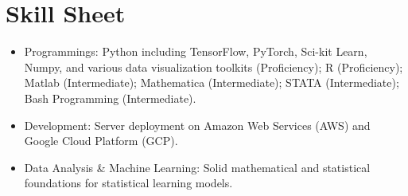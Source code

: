 \documentclass[a4paper,10pt]{article}
\begin{document}


\section{Skill Sheet}
	\begin{itemize}
		\item Programmings: Python including TensorFlow, PyTorch, Sci-kit Learn, Numpy, and various data visualization toolkits (Proficiency); R (Proficiency); Matlab (Intermediate); Mathematica (Intermediate); STATA (Intermediate); Bash Programming (Intermediate).
		\item Development: Server deployment on Amazon Web Services (AWS) and Google Cloud Platform (GCP).
		\item Data Analysis \& Machine Learning: Solid mathematical and statistical foundations for statistical learning models.
	\end{itemize}
    
\end{document}
